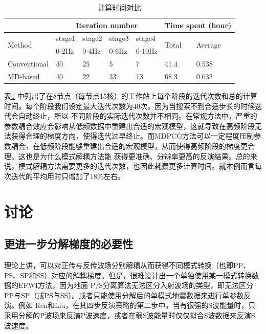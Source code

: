 \begin{table}[!htb]
    \caption{计算时间对比}
    \label{table:TotalComputime}
	\centering 
    \begin{tabular}{p{1.8cm}p{1.0cm}p{1.0cm}p{1.0cm}p{1.2cm}p{1.0cm}p{1.0cm}}
    \hline
    \quad&\multicolumn{4}{c}{Iteration number}&\multicolumn{2}{c}{Time spent (hour)} \\
    \hline
    \multirow{2}{*}{Method} & stage1 &stage2 &stage3 &stage4 &\multirow{2}{*}{Total}
    &\multirow{2}{*}{Average} \\
    & 0-2Hz &0-4Hz&0-6Hz&0-10Hz\\
    \hline
    Conventional&  40   &25&5& 7  &41.4&0.538\\
    MD-based &   40  & 22 &33 &13&68.3&0.632\\
    \hline
    \end{tabular}
\end{table}

表\ref{table:TotalComputime}
中列出了在8节点（每节点15核）的工作站上每个阶段的迭代次数和总的计算时间。每个阶段我们设定最大迭代次数为40次。因为当搜索不到合适步长的时候迭代会自动终止，所以
不同阶段的实际迭代次数并不相同。在常规方法中，严重的参数耦合效应会影响从低频数据中重建出合适的宏观模型，这就导致在高频阶段无法获得合理的梯度方向，使得迭代过早终止。而MDPCG方法可以一定程度压制参数耦合，在低频阶段能够重建出合适的宏观模型，从而使得高频阶段的梯度更合理。这也是为什么模式解耦方法能
获得更准确、分辨率更高的反演结果。总的来说，模式解耦方法需要更多的迭代次数，也因此耗费更多计算时间。就本例而言每次迭代的平均用时只增加了18\%左右。
\section{讨论}
\subsection{更进一步分解梯度的必要性}
理论上讲，可以对正传与反传波场分别解耦从而获得不同模式转换（也即PP、PS、SP和SS）对应的解耦梯度。但是，很难设计出一个单独使用某一模式转换数据的EFWI方法，因为地面
P/S分离算法无法区分入射波场的类型，即无法区分PP与SP（或PS与SS）。或者只能使用分解后的单模式地震数据来进行单参数反演。例如
Ren和Liu\cite{ren.liu:2016}，在其四步反演策略的第二步中，当有很强的S波能量时，只采用分解的P波场来反演P波速度，或者在弱S波能量时仅仅拟合S波数据来反演S波速度。



